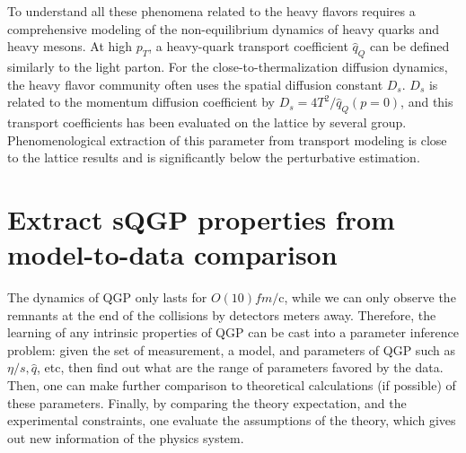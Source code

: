 To understand all these phenomena related to the heavy flavors requires a comprehensive modeling of the non-equilibrium dynamics of heavy quarks and heavy mesons.
At high $p_T$, a heavy-quark transport coefficient $\hat{q}_Q$ can be defined similarly to the light parton.
For the close-to-thermalization diffusion dynamics, the heavy flavor community often uses the spatial diffusion constant $D_s$.
$D_s$ is related to the momentum diffusion coefficient by $D_s = 4T^2/\hat{q}_Q(p=0)$, and this transport coefficients has been evaluated on the lattice by several group.
Phenomenological extraction of this parameter from transport modeling is close to the lattice results and is significantly below the perturbative estimation. 

\section{Extract sQGP properties from model-to-data comparison}
The dynamics of QGP only lasts for $O(10) fm/$c, while we can only observe the remnants at the end of the collisions by detectors meters away.
Therefore, the learning of any intrinsic properties of QGP can be cast into a parameter inference problem:
given the set of measurement, a model, and parameters of QGP such as $\eta/s, \hat{q}$, etc, then find out what are the range of parameters favored by the data.
Then, one can make further comparison to theoretical calculations (if possible) of these parameters. 
Finally, by comparing the theory expectation, and the experimental constraints, one evaluate the assumptions of the theory, which gives out new information of the physics system.

